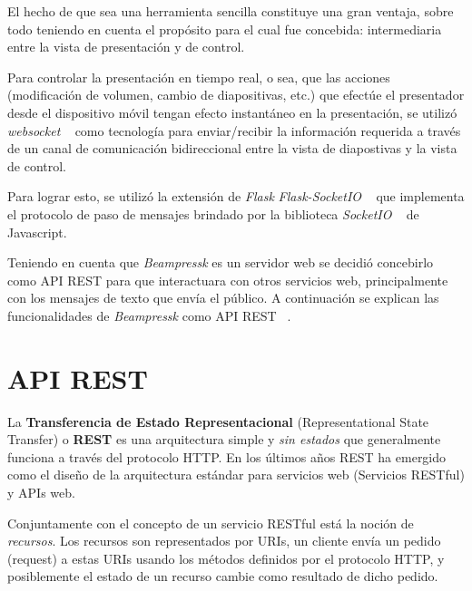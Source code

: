 		El hecho de que sea una herramienta sencilla constituye una gran ventaja, sobre todo teniendo en cuenta el propósito para el cual fue concebida: intermediaria entre la vista de presentación y de control.

		Para controlar la presentación en tiempo real, o sea, que las acciones (modificación de volumen, cambio de diapositivas, etc.) que efectúe el presentador desde el dispositivo móvil tengan efecto instantáneo en la presentación, se utilizó \textit{websocket} ~\cite{websocket} como tecnología para enviar/recibir la información requerida a través de un canal de comunicación bidireccional entre la vista de diapostivas y la vista de control.

		Para lograr esto, se utilizó la extensión de \textit{Flask} \textit{Flask-SocketIO} ~\cite{flasksocket} que implementa el protocolo de paso de mensajes brindado por la biblioteca \textit{SocketIO} ~\cite{socketio} de Javascript.

	 	Teniendo en cuenta que \textit{Beampressk} es un servidor web se decidió concebirlo como API REST para que interactuara con otros servicios web, principalmente con los mensajes de texto que envía el público. A continuación se explican las funcionalidades de \textit{Beampressk} como API REST ~\cite{book:899251}.
		

		\section{API REST} %
		\label{sec:api_rest}


			La \textbf{Transferencia de Estado Representacional} (Representational State Transfer) o \textbf{REST} es una arquitectura simple y \textit{sin estados} que generalmente funciona a través del protocolo HTTP. En los últimos años REST ha emergido como el diseño de la arquitectura estándar para servicios web (Servicios RESTful) y APIs web.

			Conjuntamente con el concepto de un servicio RESTful está la noción de \textit{recursos}. Los recursos son representados por URIs, un cliente envía un pedido (request) a estas URIs usando los métodos definidos por el protocolo HTTP, y posiblemente el estado de un recurso cambie como resultado de dicho pedido. 

